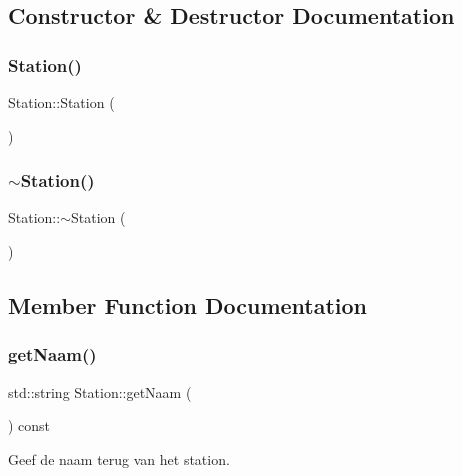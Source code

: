 \subsection{Constructor \& Destructor Documentation}
\mbox{\label{class_station_a73d335726aad1d844d81cda6d9fd74e6}} 
\subsubsection{\texorpdfstring{Station()}{Station()}}
{\footnotesize\ttfamily Station\+::\+Station (\begin{DoxyParamCaption}{ }\end{DoxyParamCaption})}

\mbox{\label{class_station_a00434e79e8ee7f4ebd6d3b631dde5ac0}} 
\subsubsection{\texorpdfstring{$\sim$\+Station()}{~Station()}}
{\footnotesize\ttfamily Station\+::$\sim$\+Station (\begin{DoxyParamCaption}{ }\end{DoxyParamCaption})\hspace{0.3cm}{\ttfamily [virtual]}}



\subsection{Member Function Documentation}
\mbox{\label{class_station_aea6c31c39a5e1eb4c30337e7ce489e69}} 
\subsubsection{\texorpdfstring{get\+Naam()}{getNaam()}}
{\footnotesize\ttfamily std\+::string Station\+::get\+Naam (\begin{DoxyParamCaption}{ }\end{DoxyParamCaption}) const}



Geef de naam terug van het station. 

